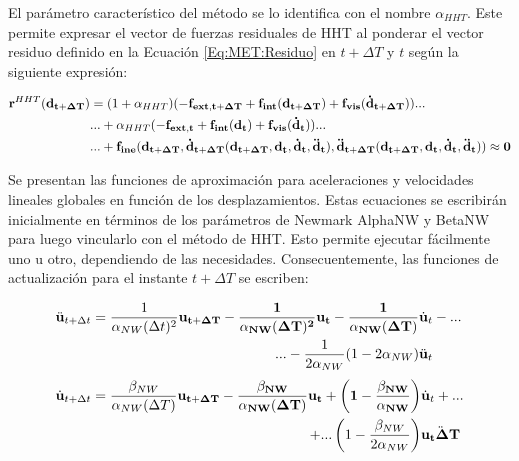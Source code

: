 El parámetro característico del método se lo identifica con el nombre $\alpha_{HHT}$. Este permite expresar el vector de fuerzas residuales de HHT al ponderar el vector residuo definido en la Ecuación \eqref{Eq:MET:Residuo} en $t+\Delta T$ y $t$ según la siguiente expresión:

\begin{equation}
\label{Eq:MET:ResHHT}
\begin{split}
	\bf{r}^{\text{$HHT$}}(\bf{d}_{t+\Delta T})&=(1+\alpha_\text{$HHT$})(-\bf{f}_{ext,t+\Delta T}+\bf{f}_{int}(\bf{d}_{t+\Delta T})+\bf{f}_{vis}(\dot{\bf{d}}_{t+\Delta T}))...\\	
	&...+\alpha_\text{$HHT$}(-\bf{f}_{ext,t}+\bf{f}_{int}(\bf{d}_{t})+\bf{f}_{vis}(\dot{\bf{d}}_{t}))...\\
	&...+\bf{f}_{ine}(\bf{d_{t+\Delta T}},\dot{\bf{d}}_{t+\Delta T}(d_{t+\Delta T},\bf{d_t},\bf{\dot{d}_t},\bf{\ddot{d}_t}),
	\ddot{\bf{d}}_{t+\Delta T}(d_{t+\Delta T},\bf{d_t},\bf{\dot{d}_t},\bf{\ddot{d}_t}))
	\approx 0
\end{split}
\end{equation}


Se presentan las funciones de aproximación para aceleraciones y velocidades lineales globales en función de los desplazamientos. Estas ecuaciones se escribirán inicialmente en términos de los parámetros de Newmark \gls{AlphaNW} y \gls{BetaNW} para luego vincularlo con el método de HHT. Esto permite ejecutar fácilmente uno u otro, dependiendo de las necesidades. Consecuentemente, las funciones de actualización para el instante $t+\Delta T$ se escriben:

\begin{align}
\ddot{\bf{u}}_{t+\Delta t} &=
\begin{aligned}[t]
	\frac{1}{\alpha_{NW}(\Delta t)^2} \bf{u}_{t+\Delta T} - \frac{1}{\alpha_{NW} (\Delta T)^2} \bf{u}_{t} 	- \frac{1}{\alpha_{NW} (\Delta T)  }& \dot{\bf{u}}_{t}-... \\
	...-\frac{1}{2 \alpha_{NW}}  (1-2\alpha_{NW} ) &\ddot{\bf{u}}_{t} \\
\end{aligned}
\label{Eq:MET:AproxAceleracion} \\[\jot]
\dot{\bf{u}}_{t+\Delta t} &=
\begin{aligned}[t]
	\frac{\beta_{NW}}{\alpha_{NW} (\Delta T)} \bf{u}_{t+\Delta T}
	- \frac{\beta_{NW}}{\alpha_{NW} (\Delta T)} \bf{u}_{t}
	+ \left( 1 - \frac{\beta_{NW}}{\alpha_{NW}} \right) &\dot{\bf{u}}_{t}+... \\
	+ ...\left( 1- \frac{\beta_{NW}}{2 \alpha_{NW}} \right) &\ddot{\bf{u}_{t}\Delta T} 
\end{aligned}
\label{Eq:MET:AproxVelcoity}
\end{align}


